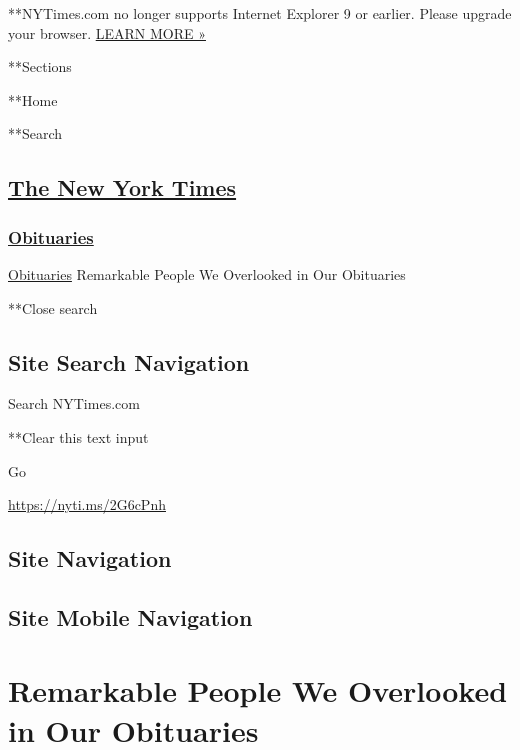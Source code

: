  **NYTimes.com no longer supports Internet Explorer 9 or earlier. Please
upgrade your browser.
\href{http://www.nytimes.com/content/help/site/ie9-support.html}{LEARN
MORE »}

**Sections

**Home

**Search

\hypertarget{the-new-york-times}{%
\subsection{\texorpdfstring{\href{http://www.nytimes.com/}{The New York
Times}}{The New York Times}}\label{the-new-york-times}}

\hypertarget{-obituaries-}{%
\subsubsection{\texorpdfstring{
\href{https://www.nytimes.com/section/obituaries}{Obituaries}
}{ Obituaries }}\label{-obituaries-}}

 \href{https://www.nytimes.com/section/obituaries}{Obituaries}
\textbar{}Remarkable People We Overlooked in Our Obituaries

**Close search

\hypertarget{site-search-navigation}{%
\subsection{Site Search Navigation}\label{site-search-navigation}}

Search NYTimes.com

**Clear this text input

Go

\url{https://nyti.ms/2G6cPnh}

\hypertarget{site-navigation}{%
\subsection{Site Navigation}\label{site-navigation}}

\hypertarget{site-mobile-navigation}{%
\subsection{Site Mobile Navigation}\label{site-mobile-navigation}}

\hypertarget{remarkable-people-we-overlooked-in-our-obituaries}{%
\section{Remarkable People We Overlooked in Our
Obituaries}\label{remarkable-people-we-overlooked-in-our-obituaries}}

